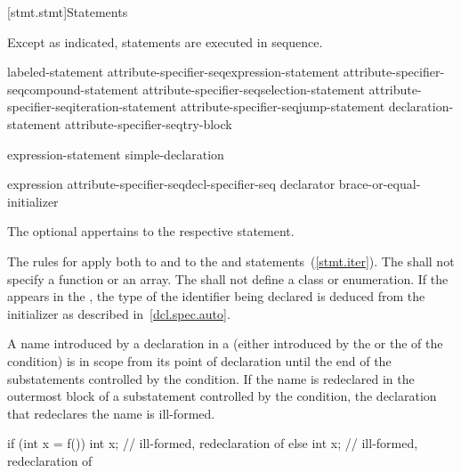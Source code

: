 [stmt.stmt]{Statements}%



\pnum
Except as indicated, statements are executed in sequence.

\begin{bnf}
\br
    labeled-statement\br
    attribute-specifier-seq\opt expression-statement\br
    attribute-specifier-seq\opt compound-statement\br
    attribute-specifier-seq\opt selection-statement\br
    attribute-specifier-seq\opt iteration-statement\br
    attribute-specifier-seq\opt jump-statement\br
    declaration-statement\br
    attribute-specifier-seq\opt try-block

\br
    expression-statement\br
    simple-declaration

\br
    expression\br
    attribute-specifier-seq\opt decl-specifier-seq declarator brace-or-equal-initializer
\end{bnf}

The optional  appertains to the respective statement.

\pnum
{}%
The rules for  apply both to
 and to the  and 
statements~(\ref{stmt.iter}). The  shall not
specify a function or an array. The  shall not
define a class or enumeration. If the   appears in
the ,
the type of the identifier being declared is deduced from the initializer as described in~\ref{dcl.spec.auto}.

\pnum
{}%
%
A name introduced by a declaration in a  (either
introduced by the  or the
 of the condition) is in scope from its point of
declaration until the end of the substatements controlled by the
condition. If the name is redeclared in the outermost block of a
substatement controlled by the condition, the declaration that
redeclares the name is ill-formed.
\begin{example}

\begin{codeblock}
if (int x = f()) {
  int x;            // ill-formed, redeclaration of 
}
else {
  int x;            // ill-formed, redeclaration of 
}
\end{codeblock}
\end{example}

